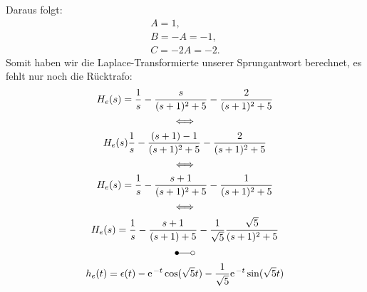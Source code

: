 \documentclass[11pt,a4paper,DIV=12]{scrartcl}
\begin{document}
Daraus folgt:
\begin{gather}
	A=1,\\
	B=-A=-1,\\
	C=-2A=-2.
\end{gather}
Somit haben wir die Laplace-Transformierte unserer Sprungantwort berechnet, es fehlt nur noch die Rücktrafo:
\begin{gather}
	H_e(s)=\frac{1}{s}-\frac{s}{(s+1)^2+5}-\frac{2}{(s+1)^2+5}\\
	\Longleftrightarrow\nonumber\\
	H_e(s)\frac{1}{s}-\frac{(s+1)-1}{(s+1)^2+5}-\frac{2}{(s+1)^2+5}\\
	\Longleftrightarrow\nonumber\\
	H_e(s)=\frac{1}{s}-\frac{s+1}{(s+1)^2+5}-\frac{1}{(s+1)^2+5}\\
	\Longleftrightarrow\nonumber\\
	H_e(s)=\frac{1}{s}-\frac{s+1}{(s+1)+5}-\frac{1}{\sqrt{5}}\frac{\sqrt{5}}{(s+1)^2+5}\\
	\Laplace\nonumber\\
	h_e(t)=\epsilon(t)-\e^{-t}\cos(\sqrt{5}t)-\frac{1}{\sqrt{5}}\e^{-t}\sin(\sqrt{5}t)
\end{gather}
\end{document}

